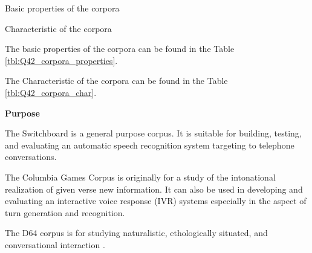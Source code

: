 \documentclass[12pt]{article}
\newenvironment{problem}[2][Problem]{\begin{trivlist}
\item[\hskip \labelsep {\bfseries #1}\hskip \labelsep {\bfseries #2.}]}{\end{trivlist}}
\begin{document}
\begin{problem}{4.2}
    \begin{table}
        \centering
        \caption{Basic properties of the corpora}
        \label{tbl:Q42_corpora_properties}    
    \end{table}

    \begin{table}
        \centering
        \caption{Characteristic of the corpora}
        \label{tbl:Q42_corpora_char}    
    \end{table}

    The basic properties of the corpora can be found in the Table \ref{tbl:Q42_corpora_properties}.

    The Characteristic of the corpora can be found in the Table \ref{tbl:Q42_corpora_char}.

\noindent\textbf{Purpose}

    The Switchboard is a general purpose corpus. It is suitable for building,
    testing, and evaluating an automatic speech recognition system targeting to 
    telephone conversations. \cite{switchboard_intro}

    The Columbia Games Corpus is originally for a study of the intonational 
    realization of given verse new information. 
    It can also be used in developing and evaluating an interactive voice 
    response (IVR) systems especially in the aspect of turn generation and recognition.
    \cite{moller2007evaluating}

    The D64 corpus is for studying naturalistic, ethologically situated, 
    and conversational interaction \cite{oertel2013d64}. 

\end{problem}
\pagebreak
\end{document}

